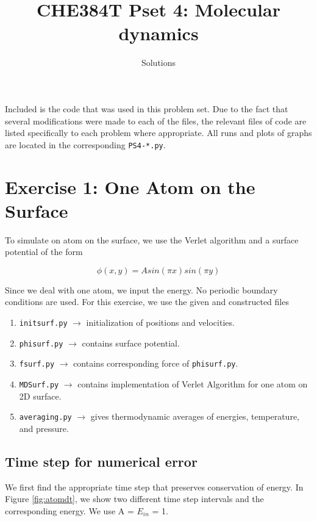 \documentclass[12pt, oneside]{article}
\title{CHE384T Pset 4: Molecular dynamics}
\author{Solutions}
\begin{document}
\maketitle

Included is the code that was used in this problem set. Due to the fact that several modifications were made to each of the files, the relevant files of code are listed specifically to each problem where appropriate. All runs and plots of graphs are located in the corresponding \verb!PS4-*.py!.


\section{Exercise 1: One Atom on the Surface}

To simulate on atom on the surface, we use the Verlet algorithm and a surface potential of the form

\begin{equation}
     \phi (x,y) = A sin(\pi x)sin(\pi y)
\end{equation}

Since we deal with one atom, we input the energy. No periodic boundary conditions are used. For this exercise, we use the given and constructed files 

\vspace{5mm}
 \begin{enumerate}
   \item \verb!initsurf.py!   $\rightarrow$ initialization of positions and velocities.
   \item \verb!phisurf.py!  $\rightarrow$ contains surface potential.
    \item \verb!fsurf.py!     $\rightarrow$ contains corresponding force of \verb!phisurf.py!.
    \item \verb!MDSurf.py!  $\rightarrow$ contains implementation of Verlet Algorithm for one atom on 2D surface.
    \item \verb!averaging.py!  $\rightarrow$ gives thermodynamic averages of energies, temperature, and pressure.
\end{enumerate}
 \vspace{5mm}

\subsection{Time step for numerical error}
We first find the appropriate time step that preserves conservation of energy. In Figure \ref{fig:atomdt}, we show two different time step intervals and the corresponding energy. We use A = $E_{in}$ = 1.
\end{document}
